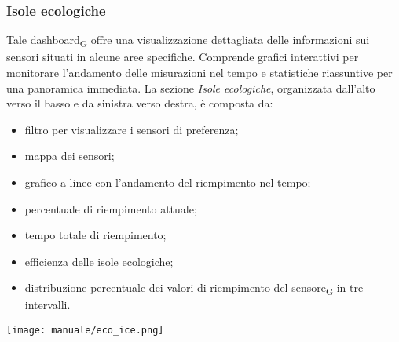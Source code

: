\newpage
\subsubsection{Isole ecologiche}
Tale \href{https://7last.github.io/docs/pb/documentazione-interna/glossario\#dashboard}{dashboard\textsubscript{G}} offre una visualizzazione dettagliata delle informazioni sui sensori situati in alcune aree specifiche. Comprende grafici interattivi per monitorare l'andamento delle misurazioni nel tempo e statistiche riassuntive per una panoramica immediata. La sezione \textit{Isole ecologiche}, organizzata dall'alto verso il basso e da sinistra verso destra, è composta da:
\begin{itemize}
    \item filtro per visualizzare i sensori di preferenza;
    \item mappa dei sensori;
    \item grafico a linee con l'andamento del riempimento nel tempo;
    \item percentuale di riempimento attuale;
    \item tempo totale di riempimento;
    \item efficienza delle isole ecologiche;
    \item distribuzione percentuale dei valori di riempimento del \href{https://7last.github.io/docs/pb/documentazione-interna/glossario\#sensore}{sensore\textsubscript{G}} in tre intervalli.
\end{itemize}
\begin{center}
    \texttt{[image: manuale/eco\_ice.png]}
\end{center}

